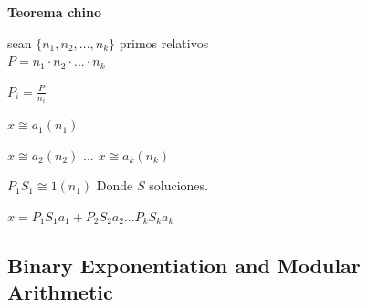 \textbf{Teorema chino}

sean $\{n_{1}, n_{2},..., n_{k} \}$ primos relativos\\

$P = n_{1}\cdot n_{2}\cdot ...\cdot n_{k}$

$P_{i} = \frac{P}{n_{i}}$

$x\cong a_{1}(n_{1})$

$x\cong a_{2}(n_{2})$
$...$
$x\cong a_{k}(n_{k})$

$P_{1}S_{1} \cong 1(n_{1})$ Donde $S$ soluciones.

$x = P_{1}S_{1}a_{1} + P_{2}S_{2}a_{2} ... P_{k}S_{k}a_{k}$


\subsection{Binary Exponentiation and Modular Arithmetic}
